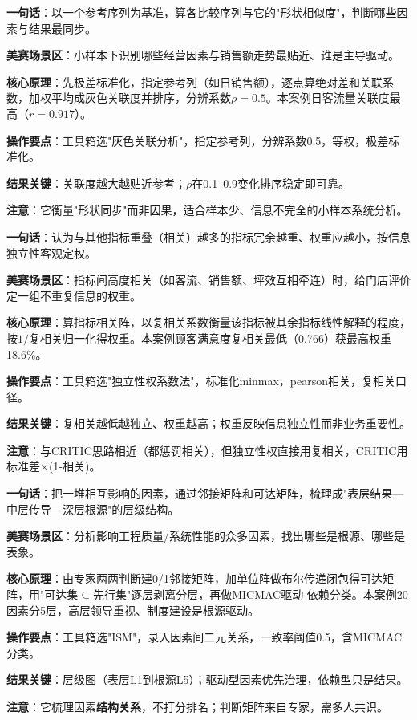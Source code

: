 
\begin{algobrief}
\textbf{一句话}：以一个参考序列为基准，算各比较序列与它的"形状相似度"，判断哪些因素与结果最同步。

\textbf{美赛场景区}：小样本下识别哪些经营因素与销售额走势最贴近、谁是主导驱动。

\textbf{核心原理}：先极差标准化，指定参考列（如日销售额），逐点算绝对差和关联系数，加权平均成灰色关联度并排序，分辨系数$\rho=0.5$。本案例日客流量关联度最高（$r=0.917$）。

\textbf{操作要点}：工具箱选"灰色关联分析"，指定参考列，分辨系数0.5，等权，极差标准化。

\textbf{结果关键}：关联度越大越贴近参考；$\rho$在0.1--0.9变化排序稳定即可靠。

\textbf{注意}：它衡量"形状同步"而非因果，适合样本少、信息不完全的小样本系统分析。
\end{algobrief}


\begin{algobrief}
\textbf{一句话}：认为与其他指标重叠（相关）越多的指标冗余越重、权重应越小，按信息独立性客观定权。

\textbf{美赛场景区}：指标间高度相关（如客流、销售额、坪效互相牵连）时，给门店评价定一组不重复信息的权重。

\textbf{核心原理}：算指标相关阵，以复相关系数衡量该指标被其余指标线性解释的程度，按$1/$复相关归一化得权重。本案例顾客满意度复相关最低（0.766）获最高权重18.6\%。

\textbf{操作要点}：工具箱选"独立性权系数法"，标准化minmax，pearson相关，复相关口径。

\textbf{结果关键}：复相关越低越独立、权重越高；权重反映信息独立性而非业务重要性。

\textbf{注意}：与CRITIC思路相近（都惩罚相关），但独立性权直接用复相关，CRITIC用标准差$\times$(1-相关)。
\end{algobrief}


\begin{algobrief}
\textbf{一句话}：把一堆相互影响的因素，通过邻接矩阵和可达矩阵，梳理成"表层结果—中层传导—深层根源"的层级结构。

\textbf{美赛场景区}：分析影响工程质量/系统性能的众多因素，找出哪些是根源、哪些是表象。

\textbf{核心原理}：由专家两两判断建0/1邻接矩阵，加单位阵做布尔传递闭包得可达矩阵，用"可达集$\subseteq$先行集"逐层剥离分层，再做MICMAC驱动-依赖分类。本案例20因素分5层，高层领导重视、制度建设是根源驱动。

\textbf{操作要点}：工具箱选"ISM"，录入因素间二元关系，一致率阈值0.5，含MICMAC分类。

\textbf{结果关键}：层级图（表层L1到根源L5）；驱动型因素优先治理，依赖型只是结果。

\textbf{注意}：它梳理因素\textbf{结构关系}，不打分排名；判断矩阵来自专家，需多人共识。
\end{algobrief}

